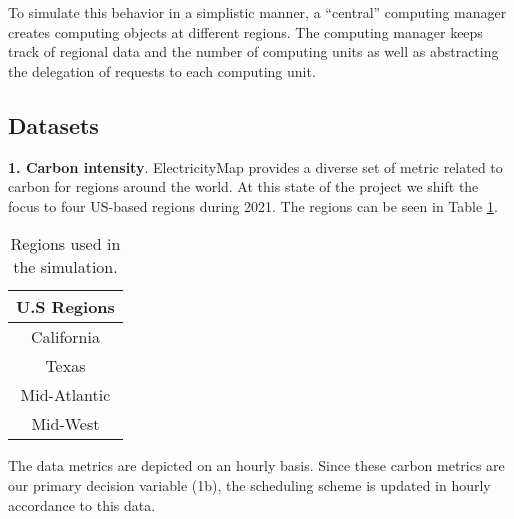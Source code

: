 To simulate this behavior in a simplistic manner, a ``central'' computing manager creates computing objects at different regions. The computing manager keeps track of regional data and the number of computing units as well as abstracting the delegation of requests to each computing unit. 
 


\subsection{Datasets}

\textbf{1. Carbon intensity}.
\label{sec:datasets}
ElectricityMap \cite{electricity_map} provides a diverse set of metric related to carbon for regions around the world. At this state of the project we shift the focus to four US-based regions during 2021. The regions can be seen in Table \ref{tab:region_data}.

\begin{table}[H]
    \centering
    
    \caption{Regions used in the simulation.}
    \begin{tabular}{|c|}
        \hline
        \textbf{U.S Regions} \\
        \hline
        California \\
        \hline
        Texas \\
        \hline
        Mid-Atlantic \\
        \hline
        Mid-West \\
        \hline
    \end{tabular}
    \label{tab:region_data}
\end{table}

The data metrics are depicted on an hourly basis. Since these carbon metrics are our primary decision variable (1b), the scheduling scheme is updated in hourly accordance to this data. 


